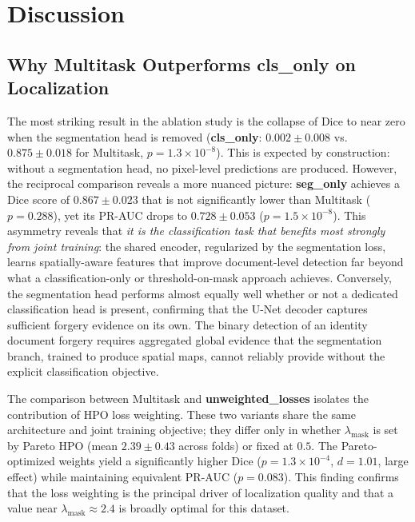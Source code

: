 
\section{Discussion}
\label{sec:discussion}

\subsection{Why Multitask Outperforms cls\_only on Localization}

The most striking result in the ablation study is the collapse of Dice to near
zero when the segmentation head is removed (\textbf{cls\_only}: $0.002 \pm 0.008$
vs.\ $0.875 \pm 0.018$ for Multitask, $p = 1.3 \times 10^{-8}$). This is
expected by construction: without a segmentation head, no pixel-level predictions
are produced. However, the reciprocal comparison reveals a more nuanced
picture: \textbf{seg\_only} achieves a Dice score of $0.867 \pm 0.023$ that is
not significantly lower than Multitask ($p = 0.288$), yet its PR-AUC drops to
$0.728 \pm 0.053$ ($p = 1.5 \times 10^{-8}$). This asymmetry reveals that
\emph{it is the classification task that benefits most strongly from joint
training}: the shared encoder, regularized by the segmentation loss, learns
spatially-aware features that improve document-level detection far beyond what
a classification-only or threshold-on-mask approach achieves. Conversely,
the segmentation head performs almost equally well whether or not a dedicated
classification head is present, confirming that the U-Net decoder captures
sufficient forgery evidence on its own. The binary detection of an
identity document forgery requires aggregated global evidence that the
segmentation branch, trained to produce spatial maps, cannot reliably provide
without the explicit classification objective.

The comparison between Multitask and \textbf{unweighted\_losses} isolates the
contribution of HPO loss weighting. These two variants share the same architecture
and joint training objective; they differ only in whether $\lambda_{\text{mask}}$
is set by Pareto HPO (mean $2.39 \pm 0.43$ across folds) or fixed at $0.5$. The
Pareto-optimized weights yield a significantly higher Dice ($p = 1.3 \times 10^{-4}$,
$d = 1.01$, large effect) while maintaining equivalent PR-AUC ($p = 0.083$).
This finding confirms that the loss weighting is the principal driver of
localization quality and that a value near $\lambda_{\text{mask}} \approx 2.4$
is broadly optimal for this dataset.

